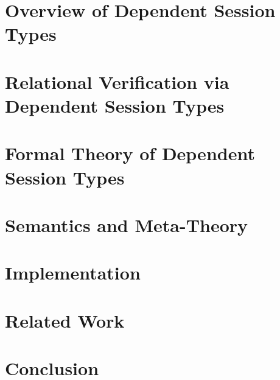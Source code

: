 \documentclass[acmsmall,10pt,anonymous]{acmart}
\begin{document}
\section{Overview of Dependent Session Types}\label{sec:overview}


\section{Relational Verification via Dependent Session Types}\label{sec:relational}


\section{Formal Theory of Dependent Session Types}\label{sec:theory}


\section{Semantics and Meta-Theory}\label{sec:semantics}


\section{Implementation}\label{sec:implementation}


\section{Related Work}\label{sec:related}
\section{Conclusion}\label{sec:conclusion}


\end{document}

